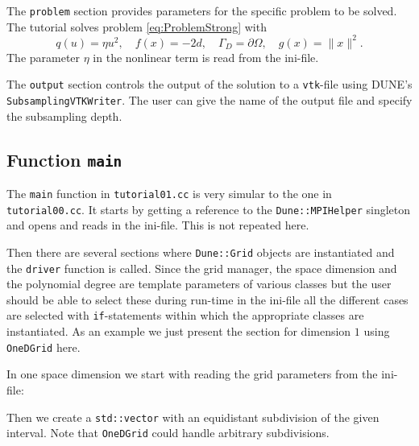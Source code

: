 \documentclass[a4paper,12pt]{article}
\begin{document}

The \lstinline{problem} section provides parameters for the
specific problem to be solved. The tutorial solves problem \eqref{eq:ProblemStrong}
with $$q(u)=\eta u^2, \quad f(x) = -2d, \quad \Gamma_D=\partial\Omega,
\quad g(x)=\|x\|^2 .$$
The parameter $\eta$ in the nonlinear term is read from the ini-file.


The \lstinline{output} section controls the output of the solution
to a \lstinline{vtk}-file using DUNE's \lstinline{SubsamplingVTKWriter}.
The user can give the name of the output file and specify the subsampling depth.

\subsection{Function \lstinline{main}}

The \lstinline{main} function  in \lstinline{tutorial01.cc} is very simular to the one
in \lstinline{tutorial00.cc}. It starts by getting a reference to the
\lstinline{Dune::MPIHelper} singleton and opens and reads in the ini-file.
This is not repeated here.

Then there are several sections where \lstinline{Dune::Grid} objects are instantiated
and the \lstinline{driver} function is called. Since the grid manager, the space
dimension and the polynomial degree are template parameters of various classes
but the user should be able to select these during run-time in the ini-file all
the different cases are selected with \lstinline{if}-statements within which
the appropriate classes are instantiated. As an example we just
present the section for dimension $1$ using \lstinline{OneDGrid} here.

In one space dimension we start with reading the grid parameters
from the ini-file:


Then we create a \lstinline{std::vector} with an equidistant
subdivision of the given interval. Note that \lstinline{OneDGrid}
could handle arbitrary subdivisions.

\end{document}
